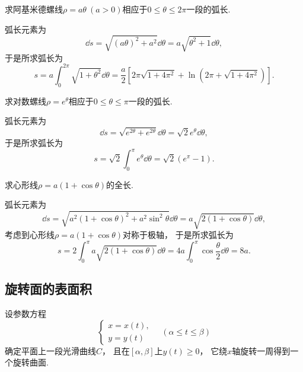 \begin{example}
求阿基米德螺线\(\rho=a\theta\ (a>0)\)相应于\(0\leq\theta\leq2\pi\)一段的弧长.
\begin{solution}
弧长元素为\[
	\dd{s} = \sqrt{(a\theta)^2 + a^2} \dd{\theta}
	= a\sqrt{\theta^2+1} \dd{\theta},
\]
于是所求弧长为\[
	s = a \int_0^{2\pi} \sqrt{1+\theta^2} \dd{\theta}
	= \frac{a}{2} \left[
	2\pi\sqrt{1+4\pi^2} + \ln(2\pi+\sqrt{1+4\pi^2})
	\right].
\]
\end{solution}
\end{example}

\begin{example}
求对数螺线\(\rho=e^{\theta}\)相应于\(0\leq\theta\leq\pi\)一段的弧长.
\begin{solution}
弧长元素为\[
	\dd{s} = \sqrt{e^{2\theta}+e^{2\theta}} \dd{\theta}
	= \sqrt{2}e^{\theta} \dd{\theta},
\]
于是所求弧长为\[
	s = \sqrt{2} \int_0^\pi e^{\theta} \dd{\theta}
	= \sqrt{2} (e^\pi-1).
\]
\end{solution}
\end{example}

\begin{example}
求心形线\(\rho=a(1+\cos\theta)\)的全长.
\begin{solution}
弧长元素为\[
	\dd{s} = \sqrt{a^2(1+\cos\theta)^2+a^2\sin^2\theta} \dd{\theta}
	= a \sqrt{2(1+\cos\theta)} \dd{\theta},
\]
考虑到心形线\(\rho=a(1+\cos\theta)\)对称于极轴，
于是所求弧长为\[
	s = 2 \int_0^\pi a \sqrt{2(1+\cos\theta)} \dd{\theta}
	= 4a \int_0^\pi \cos\frac\theta2 \dd{\theta}
	= 8a.
\]
\end{solution}
\end{example}

\subsection{旋转面的表面积}
设参数方程\[
	\left\{ \begin{array}{l}
		x = x(t), \\
		y = y(t)
	\end{array} \right.
	\quad(\alpha \leq t \leq \beta)
\]确定平面上一段光滑曲线\(C\)，
且在\([\alpha,\beta]\)上\(y(t) \geq 0\)，
它绕\(x\)轴旋转一周得到一个旋转曲面.

